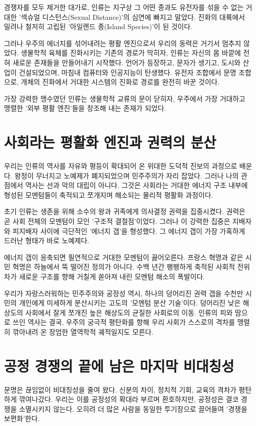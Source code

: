 \documentclass[12pt,a4paper]{article}
\begin{document}
경쟁자를 모두 제거한 대가로, 인류는 지구상 그 어떤 종과도 유전자를 섞을 수 없는 거대한 '섹슈얼 디스턴스(Sexual Distance)'의 심연에 빠지고 말았다. 진화의 대륙에서 밀려나 철저히 고립된 '아일랜드 종(Island Species)'이 된 것이다.

그러나 우주의 에너지를 섞어내려는 평활 엔진으로서 우리의 동력은 거기서 멈추지 않았다. 생물학적 육체를 진화시키는 기존의 경로가 막히자, 인류는 자신의 몸 바깥에 전혀 새로운 존재들을 만들어내기 시작했다. 언어가 등장하고, 문자가 생기고, 도시와 산업이 건설되었으며, 마침내 컴퓨터와 인공지능이 탄생했다. 유전자 조합에서 문명 조합으로, 개체의 진화에서 거대한 시스템의 진화로 경로를 완전히 바꾼 것이다.

가장 강력한 맹수였던 인류는 생물학적 교류의 문이 닫히자, 우주에서 가장 거대하고 맹렬한 '외부 평활 엔진'들을 창조해 내는 존재가 되었다.

\section{사회라는 평활화 엔진과 권력의 분산}
우리는 인류의 역사를 자유와 평등이 확대되어 온 위대한 도덕적 진보의 과정으로 배운다. 왕정이 무너지고 노예제가 폐지되었으며 민주주의가 자리 잡았다. 그러나 나의 관점에서 역사는 선과 악의 대립이 아니다. 그것은 사회라는 거대한 에너지 구조 내부에 형성된 모멘텀들이 축적되고 쪼개지며 해소되는 물리적 평활화 과정이다.

초기 인류는 생존을 위해 소수의 왕과 귀족에게 의사결정 권력을 집중시켰다. 권력은 곧 사회 전체의 모멘텀이 모인 '구조적 결절점'이었다. 그러나 이 강력한 집중은 지배자와 피지배자 사이에 극단적인 '에너지 갭'을 형성했다. 그 에너지 갭이 가장 가혹하게 드러난 형태가 바로 노예제다.

에너지 갭이 응축되면 필연적으로 거대한 모멘텀이 끓어오른다. 프랑스 혁명과 같은 시민 혁명은 하늘에서 뚝 떨어진 정의가 아니다. 수백 년간 팽팽하게 축적된 사회적 전위차가 새로운 구조를 향해 거칠게 쏟아져 내린 모멘텀 해소의 폭발이다.

우리가 자랑스러워하는 민주주의와 공정성 역시, 하나의 덩어리진 권력 갭을 수천만 시민의 개인에게 미세하게 분산시키는 고도의 '모멘텀 분산 기술'이다. 덩어리진 낮은 해상도의 사회에서 잘게 쪼개진 높은 해상도의 균질한 사회로의 이동. 인류의 피와 땀으로 쓰인 역사는 결국, 우주의 궁극적 평탄화를 향해 우리 사회가 스스로의 격차를 맹렬히 깎아내려 온 장엄한 열역학적 궤적일지도 모른다.

\section{공정 경쟁의 끝에 남은 마지막 비대칭성}
문명은 끊임없이 비대칭성을 줄여 왔다. 신분의 차이, 정치적 기회, 교육의 격차가 평탄하게 깎여나갔다. 우리는 이를 공정성의 확대라 부르며 환호하지만, 공정성은 결코 경쟁을 소멸시키지 않는다. 오히려 더 많은 사람을 동일한 투기장으로 끌어들여 '경쟁을 보편화'한다.
\end{document}
